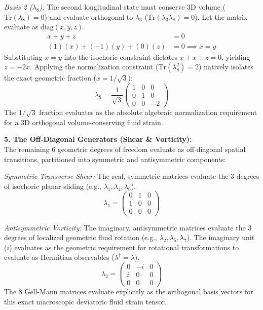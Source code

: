 \documentclass[11pt, a4paper]{article}
\begin{document}
\textit{Basis 2 ($\lambda_8$):} 
The second longitudinal state must conserve 3D volume ($\text{Tr}(\lambda_8) = 0$) and evaluate orthogonal to $\lambda_3$ ($\text{Tr}(\lambda_3 \lambda_8) = 0$). Let the matrix evaluate as $\text{diag}(x, y, z)$.
\begin{align}
    x + y + z &= 0 \nonumber \\
    (1)(x) + (-1)(y) + (0)(z) &= 0 \implies x = y \nonumber
\end{align}
Substituting $x = y$ into the isochoric constraint dictates $x + x + z = 0$, yielding $z = -2x$. Applying the normalization constraint ($\text{Tr}(\lambda_8^2) = 2$) natively isolates the exact geometric fraction ($x = 1/\sqrt{3}$):
\begin{equation}
    \lambda_8 = \frac{1}{\sqrt{3}} \begin{pmatrix} 1 & 0 & 0 \\ 0 & 1 & 0 \\ 0 & 0 & -2 \end{pmatrix} 
\end{equation}
The $1/\sqrt{3}$ fraction evaluates as the absolute algebraic normalization requirement for a 3D orthogonal volume-conserving fluid strain.

\textbf{5. The Off-Diagonal Generators (Shear \& Vorticity):} \\
The remaining $6$ geometric degrees of freedom evaluate as off-diagonal spatial transitions, partitioned into symmetric and antisymmetric components:

\textit{Symmetric Transverse Shear:} The real, symmetric matrices evaluate the $3$ degrees of isochoric planar sliding (e.g., $\lambda_1, \lambda_4, \lambda_6$).
\begin{equation}
    \lambda_1 = \begin{pmatrix} 0 & 1 & 0 \\ 1 & 0 & 0 \\ 0 & 0 & 0 \end{pmatrix} 
\end{equation}

\textit{Antisymmetric Vorticity:} The imaginary, antisymmetric matrices evaluate the $3$ degrees of localized geometric fluid rotation (e.g., $\lambda_2, \lambda_5, \lambda_7$). The imaginary unit ($i$) evaluates as the geometric requirement for rotational transformations to evaluate as Hermitian observables ($\lambda^\dagger = \lambda$).
\begin{equation}
    \lambda_2 = \begin{pmatrix} 0 & -i & 0 \\ i & 0 & 0 \\ 0 & 0 & 0 \end{pmatrix} 
\end{equation}
The $8$ Gell-Mann matrices evaluate explicitly as the orthogonal basis vectors for this exact macroscopic deviatoric fluid strain tensor. 
\end{document}
